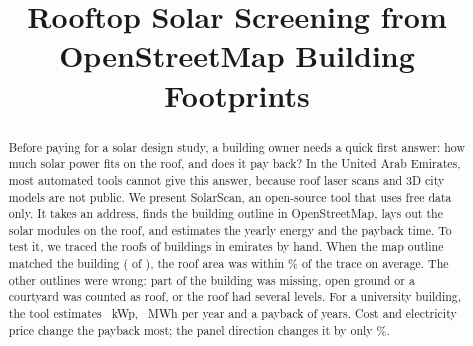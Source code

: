 \documentclass[conference]{IEEEtran}
\begin{document}
\title{Rooftop Solar Screening from\\OpenStreetMap Building Footprints}

\author{
\and
{}
\and
{}
}

\maketitle

\begin{abstract}
Before paying for a solar design study, a building owner needs a quick first answer: how much solar power fits on the roof, and does it pay back? In the United Arab Emirates, most automated tools cannot give this answer, because roof laser scans and 3D city models are not public. We present SolarScan, an open-source tool that uses free data only. It takes an address, finds the building outline in OpenStreetMap, lays out the solar modules on the roof, and estimates the yearly energy and the payback time. To test it, we traced the roofs of \NBuildings{} buildings in \NEmirates{} emirates by hand. When the map outline matched the building (\NOsmOk{} of \NManual), the roof area was within \OkMape\% of the trace on average. The other \NOsmBad{} outlines were wrong: part of the building was missing, open ground or a courtyard was counted as roof, or the roof had several levels. For a university building, the tool estimates \CasePdc~kWp, \CaseEnergy~MWh per year and a payback of \CasePayback{} years. Cost and electricity price change the payback most; the panel direction changes it by only \CaseAlLoss\%.
\end{abstract}
\end{document}
